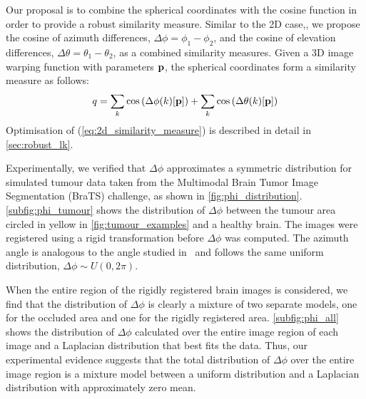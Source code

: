 Our proposal is to combine the spherical coordinates with the cosine function in
order to provide a robust similarity measure. Similar to the 2D case,, we
propose the cosine of azimuth differences, $\Delta \phi = \phi_1 - \phi_2$, and
the cosine of elevation differences, $\Delta \theta = \theta_1 - \theta_2$, as a
combined similarity measures. Given a 3D image warping function with parameters
$\boldsymbol{\mathbf{p}}$, the spherical coordinates form a similarity measure as follows:
\begin{equation}\label{eq:spherical_similarity_measure}
    q = \sum_k \cos \left(\Delta \phi(k)[\boldsymbol{\mathbf{p}}]\right) + \sum_k \cos \left(\Delta \theta(k)[\boldsymbol{\mathbf{p}}]\right)
\end{equation}
Optimisation of (\ref{eq:2d_similarity_measure}) is described in detail in
\cref{sec:robust_lk}.

Experimentally, we verified that $\Delta \phi$ approximates a symmetric
distribution for simulated tumour data taken from the Multimodal Brain Tumor
Image Segmentation (BraTS) challenge, as shown in
\cref{fig:phi_distribution}. \cref{subfig:phi_tumour} shows the
distribution of $\Delta \phi$ between the tumour area circled in yellow in
\cref{fig:tumour_examples} and a healthy brain. The images were registered
using a rigid transformation before $\Delta \phi$ was computed.  The azimuth
angle is analogous to the angle studied in~\cite{RefWorks:68} and follows the
same uniform distribution, $\Delta \phi \sim U(0, 2\pi)$.

When the entire region of the rigidly registered brain images is considered, we
find that the distribution of $\Delta \phi$ is clearly a mixture of two separate
models, one for the occluded area and one for the rigidly registered area.
\cref{subfig:phi_all} shows the distribution of $\Delta \phi$ calculated
over the entire image region of each image and a Laplacian distribution that
best fits the data. Thus, our experimental evidence suggests that the total
distribution of $\Delta \phi$ over the entire image region is a mixture model
between a uniform distribution and a Laplacian distribution with approximately
zero mean.
